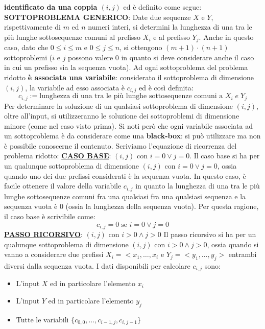 \documentclass[12pt]{article}
\begin{document}
\textbf{identificato da una coppia $(i,j)$} ed è definito come segue: \newline
\textbf{SOTTOPROBLEMA GENERICO}: Date due sequenze $X$ e $Y$, rispettivamente di $m$ ed $n$ numeri interi, si determini la lunghezza di una tra le più lunghe sottosequenze comuni al prefisso $X_i$ e al prefisso $Y_j$. \newline
Anche in questo caso, dato che $0 \leq i \leq m$ e $0 \leq j \leq n$, si ottengono $(m+1) \cdot (n+1)$ sottoproblemi ($i$ e $j$ possono valere 0 in quanto si deve considerare anche il caso in cui un prefisso sia la sequenza vuota).
Ad ogni sottoproblema del problema ridotto \textbf{è associata una variabile}: considerato il sottoproblema di dimensione $(i,j)$, la variabile ad esso associata è $c_{i,j}$ ed è così definita:
$$c_{i,j} := \textrm{lunghezza di una tra le più lunghe sottosequenze comuni a } X_i \; e \; Y_j$$
Per determinare la soluzione di un qualsiasi sottoproblema di dimensione $(i,j)$, oltre all'input, si utilizzeranno le soluzione dei sottoproblemi di dimensione minore (come nel caso visto prima).
Si noti però che ogni variabile associata ad un sottoproblema è da considerare come una \textbf{black-box}: si può utilizzare ma non è possibile conoscerne il contenuto.
Scriviamo l'equazione di ricorrenza del problema ridotto: \newline
\textbf{\underline{CASO BASE}}: $(i,j)$ con $i = 0 \vee j = 0$. \newline
Il caso base si ha per un qualunque sottoproblema di dimensione $(i,j)$ con $i = 0 \vee j = 0$, ossia quando uno dei due prefissi considerati è la sequenza vuota.
In questo caso, è facile ottenere il valore della variabile $c_{i,j}$ in quanto la lunghezza di una tra le più lunghe sottosequenze comuni fra una qualsiasi fra una qualsiasi sequenza e la sequenza vuota è 0 (ossia la lunghezza della sequenza vuota).
Per questa ragione, il caso base è scrivibile come:
$$c_{i,j} = 0 \; \textrm{se } i = 0 \vee j = 0$$
\textbf{\underline{PASSO RICORSIVO}}: $(i,j)$ con $i > 0 \land j > 0$ \newline
Il passo ricorsivo si ha per un qualunque sottoproblema di dimensione $(i,j)$ con $i > 0 \land j > 0$, ossia quando si vanno a considerare due prefissi
$X_i = <x_1,\dots,x_i$ e $Y_j = <y_1,\dots,y_j>$ entrambi diversi dalla sequenza vuota. I dati disponibili per calcolare $c_{i,j}$ sono:
\begin{itemize}
    \item L'input $X$ ed in particolare l'elemento $x_i$
    \item L'input $Y$ ed in particolare l'elemento $y_j$
    \item Tutte le variabili $\{c_{0,0}, \dots, c_{i-1, j}, c_{i, j-1} \}$
\end{itemize}
\end{document}
